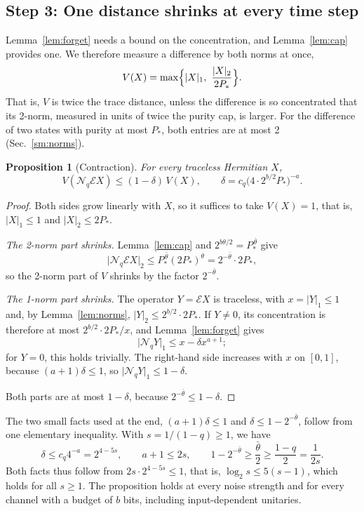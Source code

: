 \documentclass[aps,prl,twocolumn,superscriptaddress,floatfix]{revtex4-2}
\theoremstyle{plain}
\newtheorem{proposition}[lemma]{Proposition}
\newcommand{\nrm}[2]{\lvert #1\rvert_{#2}}
\newcommand{\cE}{\mathcal E}
\newcommand{\Nq}{\mathcal N_q}
\begin{document}
\subsection{Step 3: One distance shrinks at every time step}
\label{sm:contract}

Lemma~\ref{lem:forget} needs a bound on the concentration, and Lemma~\ref{lem:cap} provides one. We therefore measure a difference by both norms at once,
\begin{equation}
V(X)=\max\Bigl\{\nrm X1,\ \frac{\nrm X2}{2P_*}\Bigr\}.
\label{eq:S-V}
\end{equation}
That is, $V$ is twice the trace distance, unless the difference is so concentrated that its 2-norm, measured in units of twice the purity cap, is larger. For the difference of two states with purity at most $P_*$, both entries are at most 2 (Sec.~\ref{sm:norms}).

\begin{proposition}[Contraction]\label{prop:contraction}
For every traceless Hermitian $X$,
\begin{equation}
V(\Nq\cE X)\le(1-\delta)\,V(X),\qquad\delta=c_q\bigl(4\cdot2^{b/2}P_*\bigr)^{-a}.
\label{eq:S-contraction}
\end{equation}
\end{proposition}

\begin{proof}
Both sides grow linearly with $X$, so it suffices to take $V(X)=1$, that is, $\nrm X1\le1$ and $\nrm X2\le2P_*$.

\emph{The 2-norm part shrinks.} Lemma~\ref{lem:cap} and $2^{b\theta/2}=P_*^{\,\bar\theta}$ give
\[
\nrm{\Nq\cE X}2\le P_*^{\,\bar\theta}(2P_*)^{\theta}=2^{-\bar\theta}\cdot2P_*,
\]
so the 2-norm part of $V$ shrinks by the factor $2^{-\bar\theta}$.

\emph{The 1-norm part shrinks.} The operator $Y=\cE X$ is traceless, with $x=\nrm Y1\le1$ and, by Lemma~\ref{lem:norms}, $\nrm Y2\le2^{b/2}\cdot2P_*$. If $Y\ne0$, its concentration is therefore at most $2^{b/2}\cdot2P_*/x$, and Lemma~\ref{lem:forget} gives
\[
\nrm{\Nq Y}1\le x-\delta x^{a+1};
\]
for $Y=0$, this holds trivially. The right-hand side increases with $x$ on $[0,1]$, because $(a+1)\delta\le1$, so $\nrm{\Nq Y}1\le1-\delta$.

Both parts are at most $1-\delta$, because $2^{-\bar\theta}\le1-\delta$.
\end{proof}

The two small facts used at the end, $(a+1)\delta\le1$ and $\delta\le1-2^{-\bar\theta}$, follow from one elementary inequality. With $s=1/(1-q)\ge1$, we have
\[
\delta\le c_q4^{-a}=2^{4-5s},\qquad a+1\le2s,\qquad1-2^{-\bar\theta}\ge\frac{\bar\theta}2\ge\frac{1-q}2=\frac1{2s}.
\]
Both facts thus follow from $2s\cdot2^{4-5s}\le1$, that is, $\log_2s\le5(s-1)$, which holds for all $s\ge1$. The proposition holds at every noise strength and for every channel with a budget of $b$ bits, including input-dependent unitaries.
\end{document}

